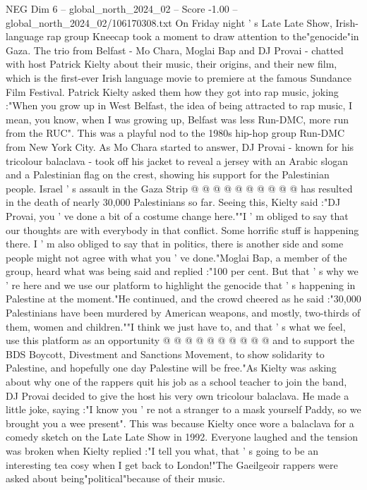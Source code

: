 \begin{textsample}{NEG Dim 6 – global\_north\_2024\_02 – Score -1.00 – global\_north\_2024\_02/106170308.txt}  \label{ex:f6_neg_249}
On Friday night ' s Late Late Show, Irish-language rap group Kneecap took a moment to draw attention to the"genocide"in Gaza.
The trio from Belfast - Mo Chara, Moglai Bap and DJ Provai - chatted with host Patrick Kielty about their music, their origins, and their new film, which is the first-ever Irish language movie to premiere at the famous Sundance Film Festival.
Patrick Kielty asked them how they got into rap music, joking :"When you grow up in West Belfast, the idea of being attracted to rap music, I mean, you know, when I was growing up, Belfast was less Run-DMC, more run from the RUC".
This was a playful nod to the 1980s hip-hop group Run-DMC from New York City.
As Mo Chara started to answer, DJ Provai - known for his tricolour balaclava - took off his jacket to reveal a jersey with an Arabic slogan and a Palestinian flag on the crest, showing his support for the Palestinian people.
Israel ' s assault in the Gaza Strip @ @ @ @ @ @ @ @ @ @ has resulted in the death of nearly 30,000 Palestinians so far.
Seeing this, Kielty said :"DJ Provai, you ' ve done a bit of a costume change here.""I ' m obliged to say that our thoughts are with everybody in that conflict.
Some horrific stuff is happening there.
I ' m also obliged to say that in politics, there is another side and some people might not agree with what you ' ve done."Moglai Bap, a member of the group, heard what was being said and replied :"100 per cent.
But that ' s why we ' re here and we use our platform to highlight the genocide that ' s happening in Palestine at the moment."He continued, and the crowd cheered as he said :"30,000 Palestinians have been murdered by American weapons, and mostly, two-thirds of them, women and children.""I think we just have to, and that ' s what we feel, use this platform as an opportunity @ @ @ @ @ @ @ @ @ @ and to support the BDS Boycott, Divestment and Sanctions Movement, to show solidarity to Palestine, and hopefully one day Palestine will be free."As Kielty was asking about why one of the rappers quit his job as a school teacher to join the band, DJ Provai decided to give the host his very own tricolour balaclava.
He made a little joke, saying :"I know you ' re not a stranger to a mask yourself Paddy, so we brought you a wee present".
This was because Kielty once wore a balaclava for a comedy sketch on the Late Late Show in 1992.
Everyone laughed and the tension was broken when Kielty replied :"I tell you what, that ' s going to be an interesting tea cosy when I get back to London!"The Gaeilgeoir rappers were asked about being"political"because of their music.

\end{textsample}
